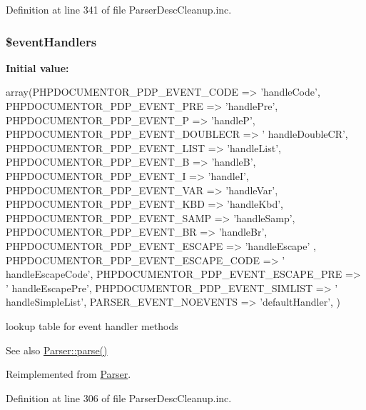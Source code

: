 \-Definition at line 341 of file \-Parser\-Desc\-Cleanup.\-inc.

\hypertarget{classparser_desc_parser_a430675102684e9ab820c7622678832b0}{
\subsubsection[{\$event\-Handlers}]{\setlength{\rightskip}{0pt plus 5cm}\$event\-Handlers}}\label{classparser_desc_parser_a430675102684e9ab820c7622678832b0}
{\bfseries \-Initial value\-:}
\begin{DoxyCode}
 array(PHPDOCUMENTOR_PDP_EVENT_CODE => 'handleCode',
                               PHPDOCUMENTOR_PDP_EVENT_PRE => 'handlePre',
                               PHPDOCUMENTOR_PDP_EVENT_P => 'handleP',
                               PHPDOCUMENTOR_PDP_EVENT_DOUBLECR => '
      handleDoubleCR',
                               PHPDOCUMENTOR_PDP_EVENT_LIST => 'handleList',
                               PHPDOCUMENTOR_PDP_EVENT_B => 'handleB',
                               PHPDOCUMENTOR_PDP_EVENT_I => 'handleI',
                               PHPDOCUMENTOR_PDP_EVENT_VAR => 'handleVar',
                               PHPDOCUMENTOR_PDP_EVENT_KBD => 'handleKbd',
                               PHPDOCUMENTOR_PDP_EVENT_SAMP => 'handleSamp',
                               PHPDOCUMENTOR_PDP_EVENT_BR => 'handleBr',
                               PHPDOCUMENTOR_PDP_EVENT_ESCAPE => 'handleEscape'
      ,
                               PHPDOCUMENTOR_PDP_EVENT_ESCAPE_CODE => '
      handleEscapeCode',
                               PHPDOCUMENTOR_PDP_EVENT_ESCAPE_PRE => '
      handleEscapePre',
                               PHPDOCUMENTOR_PDP_EVENT_SIMLIST => '
      handleSimpleList',
                               PARSER_EVENT_NOEVENTS => 'defaultHandler',
                               )
\end{DoxyCode}
lookup table for event handler methods \begin{DoxySeeAlso}{\-See also}
\hyperlink{class_parser_a20139dbf0050f44b70e34bf32d89d7e4}{\-Parser\-::parse()} 
\end{DoxySeeAlso}


\-Reimplemented from \hyperlink{class_parser_a430675102684e9ab820c7622678832b0}{\-Parser}.



\-Definition at line 306 of file \-Parser\-Desc\-Cleanup.\-inc.

